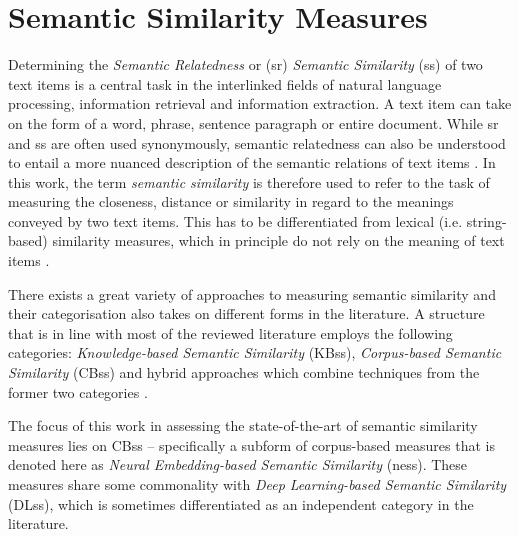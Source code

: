 \documentclass[11pt]{scrreprt}
\let\cite\parencite  %
\begin{document}
\section{Semantic Similarity Measures}
\label{sec:semantic-similarity}
Determining the \textit{Semantic Relatedness} or (\gls{sr}) \textit{Semantic Similarity} (\gls{ss}) of two text items is a central task in the interlinked fields of natural language processing, information retrieval and information extraction. A text item can take on the form of a word, phrase, sentence paragraph or entire document. While \gls{sr} and \gls{ss} are often used synonymously, semantic relatedness can also be understood to entail a more nuanced description of the semantic relations of text items \cite{chandrasekaranEvolutionSemanticSimilarity2021, harispeSemanticSimilarityNatural2015}.  In this work, the term \textit{semantic similarity} is therefore used to refer to the task of measuring the closeness, distance or similarity in regard to the meanings conveyed by two text items. This has to be differentiated from lexical (i.e. string-based) similarity measures, which in principle do not rely on the meaning of text items \cite{p.SurveySemanticSimilarity2019}. 

There exists a great variety of approaches to measuring semantic similarity and their categorisation also takes on different forms in the literature.
A structure that is in line with most of the reviewed literature employs the following categories: \textit{Knowledge-based Semantic Similarity} (KB\gls{ss}), \textit{Corpus-based Semantic Similarity} (CB\gls{ss}) and hybrid approaches which combine techniques from the former two categories
\cite{chandrasekaranEvolutionSemanticSimilarity2021, harispeSemanticSimilarityNatural2015, hanSurveyTechniquesApplications2021, zadSurveyDeepLearning2021}.

The focus of this work in assessing the state-of-the-art of semantic similarity measures lies on CB\gls{ss} -- specifically a subform of corpus-based measures that is denoted here as \textit{Neural Embedding-based Semantic Similarity} (\gls{ness}). These measures share some commonality with \textit{Deep Learning-based Semantic Similarity} (DL\gls{ss}), which is sometimes differentiated as an independent category in the literature.
\end{document}
